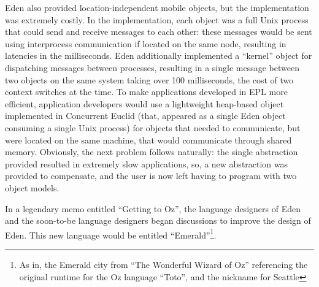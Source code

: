 Eden also provided location-independent mobile objects, but the implementation was extremely costly.  In the implementation, each object was a full Unix process that could send and receive messages to each other: these messages would be sent using interprocess communication if located on the same node, resulting in latencies in the milliseconds.  Eden additionally implemented a ``kernel'' object for dispatching messages between processes, resulting in a single message between two objects on the same system taking over 100 milliseconds, the cost of two context switches at the time.  To make applications developed in EPL more efficient, application developers would use a lightweight heap-based object implemented in Concurrent Euclid (that, appeared as a single Eden object consuming a single Unix process) for objects that needed to communicate, but were located on the same machine, that would communicate through shared memory.  Obviously, the next problem follows naturally: the single abstraction provided resulted in extremely slow applications, so, a new abstraction was provided to compensate, and the user is now left having to program with two object models.

In a legendary memo entitled ``Getting to Oz'', the language designers of Eden and the soon-to-be language designers began discussions to improve the design of Eden.  This new language would be entitled ``Emerald''\footnote{As in, the Emerald city from ``The Wonderful Wizard of Oz'' referencing the original runtime for the Oz language ``Toto'', and the nickname for Seattle}.

